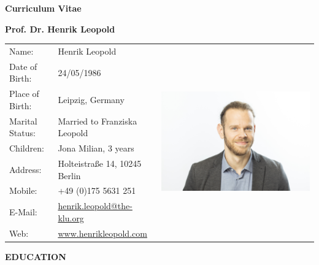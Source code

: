 \documentclass[titlepage]{article}
\newcommand{\heading}[1] {
\vspace*{0.7cm}\noindent \textcolor{myred}{\large{\textbf{\uppercase{{#1}}}}} \\[-5pt]
\noindent\makebox[\linewidth]{\rule{\textwidth}{0.4pt}\vspace*{0.2cm}}
}
\begin{document}


\centerline{\huge{\textcolor{myred}{\textbf{Curriculum Vitae}}}}
\vspace{0.5cm}
\centerline{\Large{\textbf{Prof. Dr. Henrik Leopold}}}
\vspace{1.5cm}

\begin{tabular}{P{3cm}P{5.0cm}l}
Name:					&  Henrik Leopold  &  \\
Date of Birth: 		& 24/05/1986 \\
Place of Birth: 		& Leipzig, Germany \\
Marital Status: 		& Married to Franziska Leopold \\
Children:				& Jona Milian, 3 years \\
Address:				& Holteistraße 14, 10245 Berlin \\
Mobile: 				& +49 (0)175 5631 251 \\
E-Mail: 				& \href{mailto:henrik.leopold@the-klu.org}{henrik.leopold@the-klu.org} \\
Web:						& \href{www.henrikleopold.com}{www.henrikleopold.com} \\
\end{tabular}

\heading{Education}
\end{document}

